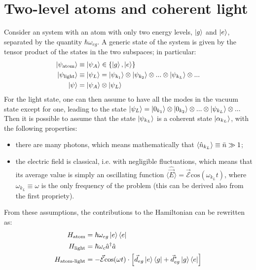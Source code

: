 %
%


\section{Two-level atoms and coherent light}
\label{sec:atom_coherent_light}

Consider an system with an atom with only two energy levels, $\ket{g}$ and $\ket{e}$, separated by the quantity $\hbar\omega_{eg}$. A generic state of the system is given by the tensor product of the states in the two subspaces; in particular: 
\begin{align*}
    \ket{\psi_\text{atom}} &\equiv \ket{\psi_A} \in \{\ket{g}, \ket{e}\}  \\
    \ket{\psi_\text{light}} &\equiv \ket{\psi_L}  = \ket{\psi_{k_1}} \otimes \ket{\psi_{k_2}} \otimes  ... \otimes \ket{\psi_{k_L}} \otimes ...  \\
    \ket{\psi} &= \ket{\psi_A} \otimes  \ket{\psi_L}
\end{align*}
For the light state, one can then assume to have all the modes in the vacuum state except for one, leading to the state $\ket{\psi_L} = \ket{0_{k_1}} \otimes \ket{0_{k_2}} \otimes ... \otimes \ket{\psi_{k_L}} \otimes ... $
Then it is possible to assume that the state $\ket{\psi_{k_L}}$ is a coherent state $\ket{\alpha_{k_L}}$, with the following properties:
    \begin{itemize}
        \item there are many photons, which means mathematically that $\left<\hat{n}_{k_L}\right> \equiv \Bar{n} \gg 1$;
        \item the electric field is classical, i.e. with negligible fluctuations, which means that its average value is simply an oscillating function $\langle \hat{\Vec{E}}\rangle= \Vec{\mathcal{E}} \text{cos}(\omega_{k_L} t)$, where $\omega_{k_L} \equiv \omega$ is the only frequency of the problem (this can be derived also from the first propriety). 
    \end{itemize}
From these assumptions, the contributions to the Hamiltonian can be rewritten as:
\begin{align}
    H_\text{atom} &= \hbar \omega_{eg} \ket{e}\bra{e} \\
    H_\text{light} &= \hbar \omega_c \hat{a}^\dagger \hat{a} \\
    H_\text{atom-light} &= - \Vec{\mathcal{E}} \text{cos}(\omega t) \cdot \left[ \Vec{d}_{eg} \ket{e}\bra{g} + \Vec{d}^*_{eg} \ket{g}\bra{e} \right]
\end{align}
